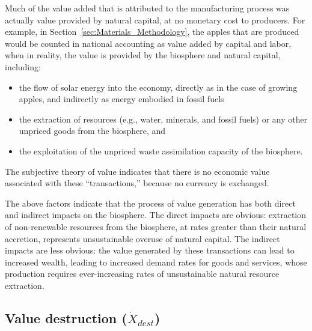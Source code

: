 Much
of the 
value added that is attributed to the manufacturing
process was actually value provided by 
natural capital, at  no  
monetary cost to producers. For example, in Section~\ref{sec:Materials_Methodology}, the
apples that are produced would be counted
in national accounting as value added by capital 
and labor, when in reality, the value is provided
by the biosphere and natural capital, including:
%
\begin{itemize}
	
	\item{the flow of solar energy
	into the economy, directly as in the case
	of growing apples, and indirectly as energy embodied
	in fossil fuels}
	
	\item{the extraction of resources (e.g., water, minerals, and
	fossil fuels) or any other unpriced goods from the biosphere, and}
	
	\item{the exploitation of the unpriced waste assimilation capacity of the biosphere.}
	
\end{itemize}
%
The subjective theory of value indicates that 
there is no economic value associated with these ``transactions,'' 
because no currency is exchanged. 

The above factors indicate that the process of value generation
has both direct and indirect impacts on the biosphere.
The direct impacts are obvious: 
extraction of non-renewable resources from the biosphere, 
at rates greater than their natural accretion,
represents unsustainable overuse of natural capital.
The indirect impacts are less obvious: 
the value generated by these transactions can lead to increased wealth,
leading to increased demand rates for goods and services, 
whose production requires ever-increasing rates 
of unsustainable natural resource extraction.


\subsection[Value destruction]{Value destruction ($\dot{X}_{dest}$)}

